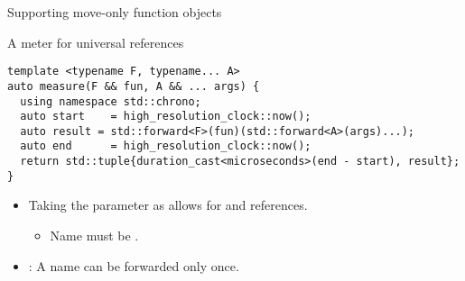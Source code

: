 \begin{frame}[t,fragile]{Supporting move-only function objects}
\begin{block}{A meter for universal references}
\begin{lstlisting}
template <typename F, typename... A>
auto measure(F && fun, A && ... args) {
  using namespace std::chrono;
  auto start    = high_resolution_clock::now();
  auto result = std::forward<F>(fun)(std::forward<A>(args)...);
  auto end      = high_resolution_clock::now();
  return std::tuple{duration_cast<microseconds>(end - start), result};
}
\end{lstlisting}
\end{block}

\begin{itemize}
  \item Taking the  parameter as  allows
        for  and  references.
    \begin{itemize}
      \item Name must be .
    \end{itemize}
  \item {}: A name can be forwarded only once.
\end{itemize}
\end{frame}
